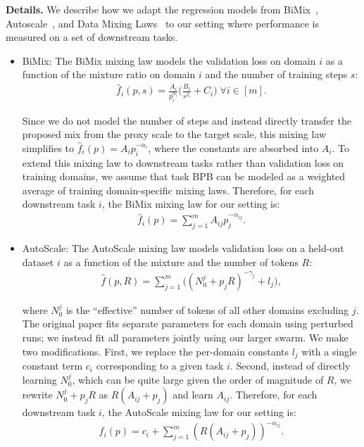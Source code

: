 \documentclass[table]{ai2style/ai2}
\begin{document}
\textbf{Details.} We describe how we adapt the regression models from BiMix~\citep{ge2025bimixbivariatedatamixing}, Autoscale~\citep{kang2025autoscalescaleawaredatamixing}, and Data Mixing Laws~\citep{ye2025datamixinglawsoptimizing} to our setting where performance is measured on a set of downstream tasks.

\begin{itemize}
    \item BiMix: The BiMix mixing law models the validation loss on domain $i$ as a function of the mixture ratio on domain $i$ and the number of training steps $s$:
    \begin{align}
        \hat{f}_i(p, s) = \frac{A_i}{p_i^{\alpha_i}} \bigg( \frac{B_i}{s^{\beta_i}} + C_i\bigg) \; \forall i \in [m].
    \end{align}

    Since we do not model the number of steps and instead directly transfer the proposed mix from the proxy scale to the target scale, this mixing law simplifies to $\hat{f}_i(p) = A_i p_i^{-\alpha_i}$, where the constants are absorbed into $A_i$. To extend this mixing law to downstream tasks rather than validation loss on training domains, we assume that task BPB can be modeled as a weighted average of training domain-specific mixing laws. Therefore, for each downstream task $i$, the BiMix mixing law for our setting is:
    \begin{align}
        \hat{f}_i(p) = \sum_{j = 1}^m A_{ij} p_j^{-\alpha_{ij}}.
    \end{align}

    \item AutoScale: The AutoScale mixing law models validation loss on a held-out dataset $i$ as a function of the mixture and the number of tokens $R$:
    \begin{align}
        \hat{f}(p, R) = \sum_{j = 1}^m \bigg((N^{j}_0 + p_j R)^{-\gamma_{j}} + l_j\bigg),
     \end{align}

     where $N^j_0$ is the ``effective'' number of tokens of all other domains excluding $j$.
     The original paper fits separate parameters for each domain using perturbed runs; we instead fit all parameters jointly using our larger swarm. We make two modifications. First, we replace the per-domain constants $l_j$ with a single constant term $c_i$ corresponding to a given task $i$. Second, instead of directly learning $N^j_0$, which can be quite large given the order of magnitude of $R$, we rewrite $N^j_0 + p_j R$ as $R(A_{ij} + p_j)$ and learn $A_{ij}$. Therefore, for each downstream task $i$, the AutoScale mixing law for our setting is:
     \begin{align}
         \hat{f}_i(p) = c_i + \sum_{j = 1}^m (R(   A_{ij} + p_j))^{-\alpha_{ij}}.
     \end{align}


\end{itemize}
\end{document}
